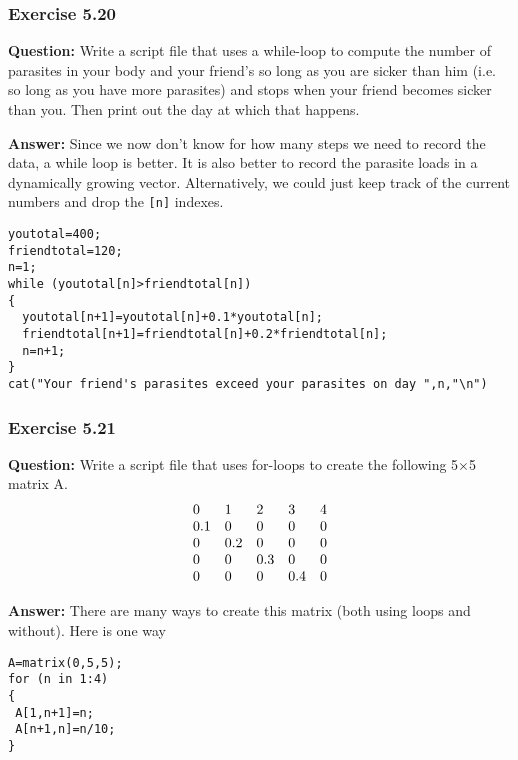 \documentclass [11pt]{article}
\newcommand{\code}[1]{{\tt #1}}
\begin{document}
\subsubsection*{Exercise 5.20}
\textbf{Question:} Write a script file that uses 
a while-loop to compute the number of parasites in your body and your 
friend's so long as you are sicker than him (i.e. so long as you have more parasites) and stops when your friend becomes sicker than you. 
Then print out the day at which that happens.


\textbf{Answer:} Since we now don't know for how many steps we need to record the data, a while loop is better. 
It is also better to record the parasite loads in a dynamically growing vector. Alternatively, we could just keep track of the current numbers and drop the \code{[n]} indexes.
\begin{verbatim}
youtotal=400;
friendtotal=120;
n=1;
while (youtotal[n]>friendtotal[n])
{
  youtotal[n+1]=youtotal[n]+0.1*youtotal[n];
  friendtotal[n+1]=friendtotal[n]+0.2*friendtotal[n];
  n=n+1;
}
cat("Your friend's parasites exceed your parasites on day ",n,"\n")
\end{verbatim}

\subsubsection*{Exercise 5.21}
\textbf{Question:}
Write a script file that uses for-loops to create the 
following 5$\times $5 matrix A.  
\[
{\begin{array}{*{20}c}
 0 \hfill & 1 \hfill & 2 \hfill & 3 \hfill & 4 \hfill \\
 {0.1} \hfill & 0 \hfill & 0 \hfill & 0 \hfill & 0 \hfill \\
 0 \hfill & {0.2} \hfill & 0 \hfill & 0 \hfill & 0 \hfill \\
 0 \hfill & 0 \hfill & {0.3} \hfill & 0 \hfill & 0 \hfill \\
 0 \hfill & 0 \hfill & 0 \hfill & {0.4} \hfill & 0 \hfill \\
\end{array} }
\]


\textbf{Answer:} There are many ways to create this matrix (both using loops and without). Here is one way
\begin{verbatim}
A=matrix(0,5,5);
for (n in 1:4)
{
 A[1,n+1]=n;
 A[n+1,n]=n/10;
}
\end{verbatim}
\end{document}
